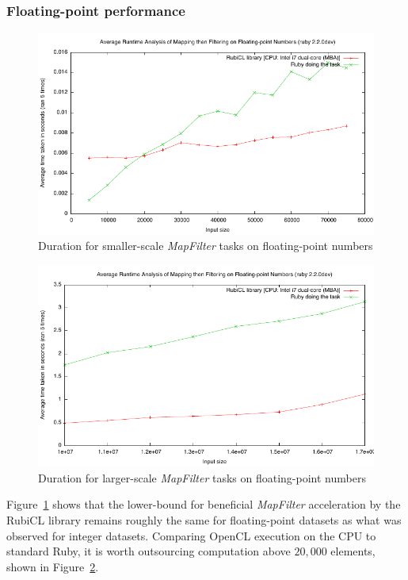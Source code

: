 \subsubsection{Floating-point performance}
\begin{figure}
  \includegraphics[width=\textwidth]{./graphing/dmapfilter.pdf}
  \caption{Duration for smaller-scale \emph{MapFilter} tasks on floating-point numbers}
  \label{fig:dmf_task_smallrun}
\end{figure}

\begin{figure}
  \includegraphics[width=\textwidth]{./graphing/dmapfilterlots.pdf}
  \caption{Duration for larger-scale \emph{MapFilter} tasks on floating-point numbers}
  \label{fig:dmf_task_bigrun}
\end{figure}

Figure~\ref{fig:dmf_task_smallrun} shows that the lower-bound for beneficial \emph{MapFilter} acceleration by the RubiCL library remains roughly the same for floating-point datasets as what was observed for integer datasets. Comparing \ac{OpenCL} execution on the \ac{CPU} to standard Ruby, it is worth outsourcing computation above $20,000$ elements, shown in Figure~\ref{fig:dmf_task_bigrun}.

